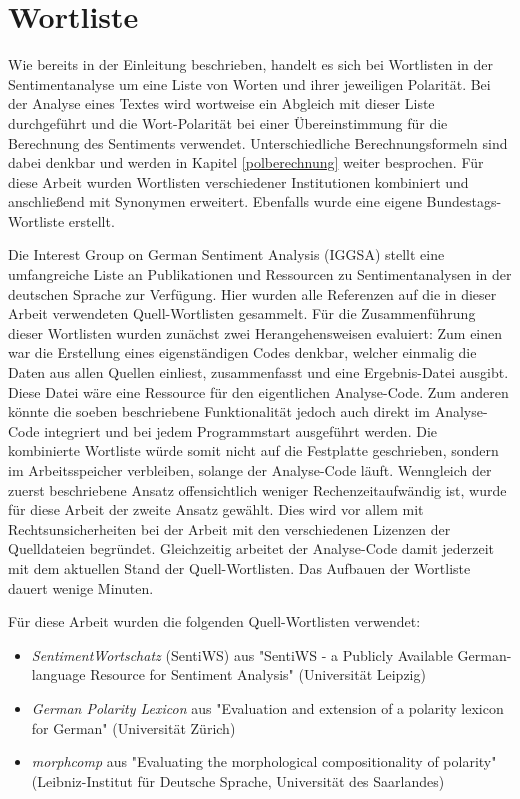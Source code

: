 \section{Wortliste}
\label{wortliste}
Wie bereits in der Einleitung beschrieben, handelt es sich bei Wortlisten in der Sentimentanalyse um eine Liste von Worten und ihrer jeweiligen Polarität. 
Bei der Analyse eines Textes wird wortweise ein Abgleich mit dieser Liste durchgeführt und die Wort-Polarität bei einer Übereinstimmung für die Berechnung des Sentiments verwendet. 
Unterschiedliche Berechnungsformeln sind dabei denkbar und werden in Kapitel \ref{polberechnung} weiter besprochen. 
Für diese Arbeit wurden Wortlisten verschiedener Institutionen kombiniert und anschließend mit Synonymen erweitert. 
Ebenfalls wurde eine eigene Bundestags-Wortliste erstellt. 

Die Interest Group on German Sentiment Analysis (IGGSA) stellt eine umfangreiche Liste an Publikationen und Ressourcen zu Sentimentanalysen in der deutschen Sprache zur Verfügung. 
Hier wurden alle Referenzen auf die in dieser Arbeit verwendeten Quell-Wortlisten gesammelt. 
Für die Zusammenführung dieser Wortlisten wurden zunächst zwei Herangehensweisen evaluiert: 
Zum einen war die Erstellung eines eigenständigen Codes denkbar, welcher einmalig die Daten aus allen Quellen einliest, zusammenfasst und eine Ergebnis-Datei ausgibt. 
Diese Datei wäre eine Ressource für den eigentlichen Analyse-Code. 
Zum anderen könnte die soeben beschriebene Funktionalität jedoch auch direkt im Analyse-Code integriert und bei jedem Programmstart ausgeführt werden. 
Die kombinierte Wortliste würde somit nicht auf die Festplatte geschrieben, sondern im Arbeitsspeicher verbleiben, solange der Analyse-Code läuft. 
Wenngleich der zuerst beschriebene Ansatz offensichtlich weniger Rechenzeitaufwändig ist, wurde für diese Arbeit der zweite Ansatz gewählt. 
Dies wird vor allem mit Rechtsunsicherheiten bei der Arbeit mit den verschiedenen Lizenzen der Quelldateien begründet. 
Gleichzeitig arbeitet der Analyse-Code damit jederzeit mit dem aktuellen Stand der Quell-Wortlisten. 
Das Aufbauen der Wortliste dauert wenige Minuten. 

Für diese Arbeit wurden die folgenden Quell-Wortlisten verwendet: 

\begin{itemize}
\item \textit{SentimentWortschatz} (SentiWS) aus "SentiWS - a Publicly Available German-language Resource for Sentiment Analysis" (Universität Leipzig)
\item \textit{German Polarity Lexicon} aus "Evaluation and extension of a polarity lexicon for German" (Universität Zürich)
\item \textit{morphcomp} aus "Evaluating the morphological compositionality of polarity" (Leibniz-Institut für Deutsche Sprache, Universität des Saarlandes)
\end{itemize}

